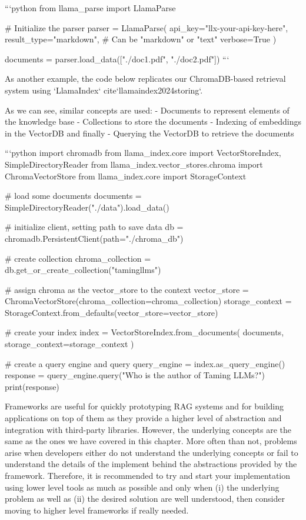 {{```python
from llama_parse import LlamaParse

# Initialize the parser
parser = LlamaParse(
    api_key="llx-your-api-key-here",
    result_type="markdown",  # Can be "markdown" or "text"
    verbose=True
)

documents = parser.load_data(["./doc1.pdf", "./doc2.pdf"])
```

As another example, the code below replicates our ChromaDB-based retrieval system using `LlamaIndex` {cite}`llamaindex2024storing`.

As we can see, similar concepts are used:
- Documents to represent elements of the knowledge base
- Collections to store the documents
- Indexing of embeddings in the VectorDB and finally
- Querying the VectorDB to retrieve the documents


```python
import chromadb
from llama_index.core import VectorStoreIndex, SimpleDirectoryReader
from llama_index.vector_stores.chroma import ChromaVectorStore
from llama_index.core import StorageContext

# load some documents
documents = SimpleDirectoryReader("./data").load_data()

# initialize client, setting path to save data
db = chromadb.PersistentClient(path="./chroma_db")

# create collection
chroma_collection = db.get_or_create_collection("tamingllms")

# assign chroma as the vector_store to the context
vector_store = ChromaVectorStore(chroma_collection=chroma_collection)
storage_context = StorageContext.from_defaults(vector_store=vector_store)

# create your index
index = VectorStoreIndex.from_documents(
    documents, storage_context=storage_context
)

# create a query engine and query
query_engine = index.as_query_engine()
response = query_engine.query("Who is the author of Taming LLMs?")
print(response)

Frameworks are useful for quickly prototyping RAG systems and for building applications on top of them as they provide a higher level of abstraction and integration with third-party libraries. However, the underlying concepts are the same as the ones we have covered in this chapter. More often than not, problems arise when developers either do not understand the underlying concepts or fail to understand the details of the implement behind the abstractions provided by the framework. Therefore, it is recommended to try and start your implementation using lower level tools as much as possible and only when (i) the underlying problem as well as (ii) the desired solution are well understood, then consider moving to higher level frameworks if really needed.

}}
